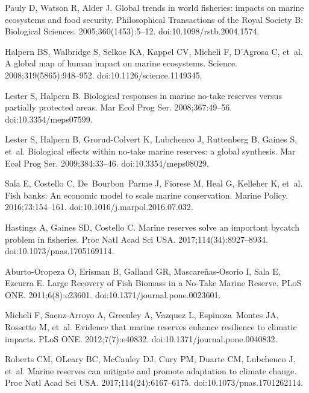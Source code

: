 \documentclass[10pt,letterpaper]{article}
\begin{document}
% 
\begin{thebibliography}{10}

Pauly D, Watson R, Alder J.
\newblock Global trends in world fisheries: impacts on marine ecosystems and
  food security.
\newblock Philosophical Transactions of the Royal Society B: Biological
  Sciences. 2005;360(1453):5--12.
\newblock doi:{10.1098/rstb.2004.1574}.

Halpern BS, Walbridge S, Selkoe KA, Kappel CV, Micheli F, D'Agrosa C, et~al.
\newblock A global map of human impact on marine ecosystems.
\newblock Science. 2008;319(5865):948--952.
\newblock doi:{10.1126/science.1149345}.

Lester S, Halpern B.
\newblock Biological responses in marine no-take reserves versus partially
  protected areas.
\newblock Mar Ecol Prog Ser. 2008;367:49--56.
\newblock doi:{10.3354/meps07599}.

Lester S, Halpern B, Grorud-Colvert K, Lubchenco J, Ruttenberg B, Gaines S,
  et~al.
\newblock Biological effects within no-take marine reserves: a global
  synthesis.
\newblock Mar Ecol Prog Ser. 2009;384:33--46.
\newblock doi:{10.3354/meps08029}.

Sala E, Costello C, De~Bourbon~Parme J, Fiorese M, Heal G, Kelleher K, et~al.
\newblock Fish banks: An economic model to scale marine conservation.
\newblock Marine Policy. 2016;73:154--161.
\newblock doi:{10.1016/j.marpol.2016.07.032}.

Hastings A, Gaines SD, Costello C.
\newblock Marine reserves solve an important bycatch problem in fisheries.
\newblock Proc Natl Acad Sci USA. 2017;114(34):8927--8934.
\newblock doi:{10.1073/pnas.1705169114}.

Aburto-Oropeza O, Erisman B, Galland GR, Mascareñas-Osorio I, Sala E, Ezcurra
  E.
\newblock Large Recovery of Fish Biomass in a No-Take Marine Reserve.
\newblock PLoS ONE. 2011;6(8):e23601.
\newblock doi:{10.1371/journal.pone.0023601}.

Micheli F, Saenz-Arroyo A, Greenley A, Vazquez L, Espinoza~Montes JA, Rossetto
  M, et~al.
\newblock Evidence that marine reserves enhance resilience to climatic impacts.
\newblock PLoS ONE. 2012;7(7):e40832.
\newblock doi:{10.1371/journal.pone.0040832}.

Roberts CM, OLeary BC, McCauley DJ, Cury PM, Duarte CM, Lubchenco J, et~al.
\newblock Marine reserves can mitigate and promote adaptation to climate
  change.
\newblock Proc Natl Acad Sci USA. 2017;114(24):6167--6175.
\newblock doi:{10.1073/pnas.1701262114}.


\end{thebibliography}
\end{document}
